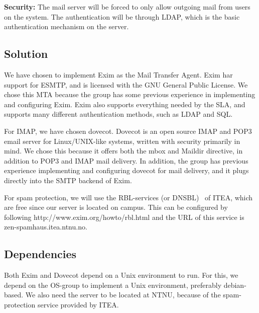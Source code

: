 \documentclass[12pt]{article}
\begin{document}
\textbf{Security:}
The mail server will be forced to only allow outgoing mail from users on
the system. The authentication will be through LDAP, which is the basic
authentication mechanism on the server.

\subsection{Solution}

We have chosen to implement Exim\cite{exim} as the Mail Transfer Agent. Exim har
support for ESMTP, and is licensed with the GNU General Public
License\cite{gnu-license}. We chose this MTA because the group has some previous
experience in implementing and configuring Exim. Exim also supports
everything needed by the SLA, and supports many different authentication
methods, such as LDAP and SQL. 

For IMAP, we have chosen dovecot. Dovecot is an open source IMAP and
POP3 email server for Linux/UNIX-like systems, written with security
primarily in mind\cite{dovecot}. We chose this because it offers both the mbox and
Maildir directive, in addition to POP3 and IMAP mail delivery. In
addition, the group has previous experience implementing and configuring
dovecot for mail delivery, and it plugs directly into the SMTP backend
of Exim.

For spam protection, we will use the RBL-services (or DNSBL)  of ITEA,
which are free since our server is located on campus. This can be
configured by following http://www.exim.org/howto/rbl.html and the URL
of this service is zen-spamhaus.itea.ntnu.no.

\subsection{Dependencies}
Both Exim and Dovecot depend on a Unix environment to run. For this, we
depend on the OS-group to implement a Unix environment, preferably
debian-based.
We also need the server to be located at NTNU, because of the
spam-protection service provided by ITEA. 

\newpage


\end{document}
